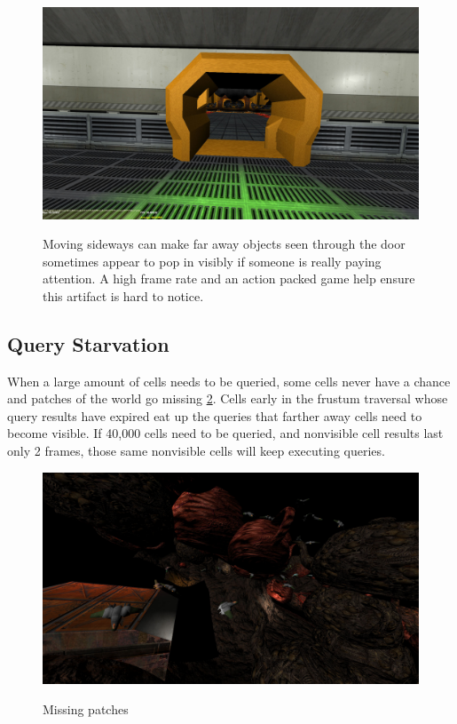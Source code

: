 \documentclass[12pt]{ucthesis}
\newcommand{\captionfonts}{\small\bf\ssp}
\begin{document}
\begin{figure}
\begin{center}
\includegraphics[width=\textwidth]{Images/HallDoorway.jpg}
\captionfonts
\caption[Hall Doorway]{Moving sideways can make far away objects seen through the door sometimes appear to pop in visibly if someone is really paying attention.
A high frame rate and an action packed game help ensure this artifact is hard to notice.}
\label{fig:hall-doorway}
\end{center}
\end{figure}

\subsection {Query Starvation}
\label{query-starvation}

When a large amount of cells needs to be queried, some cells never have a chance and patches of the world go missing \ref{fig:missing-patches}.
Cells early in the frustum traversal whose query results have expired eat up the queries that farther away cells need to become visible.
If 40,000 cells need to be queried, and nonvisible cell results last only 2 frames, those same nonvisible cells will keep executing queries.

\begin{figure}
\begin{center}
\includegraphics[width=\textwidth]{Images/MissingPatches.jpg}
\captionfonts
\caption[Missing patches]{Missing patches}
\label{fig:missing-patches}
\end{center}
\end{figure}
\end{document}
